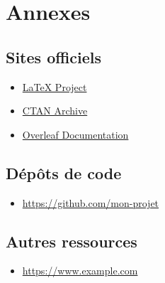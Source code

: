 \appendix

\chapter{Annexes}

\section{Sites officiels}

\begin{itemize}
	\item \href{https://www.latex-project.org/}{LaTeX Project}
	\item \href{https://ctan.org/}{CTAN Archive}
	\item \href{https://www.overleaf.com/learn}{Overleaf Documentation}
\end{itemize}

\section{Dépôts de code}

\begin{itemize}
	\item \url{https://github.com/mon-projet}
\end{itemize}

\section{Autres ressources}

\begin{itemize}
	\item \url{https://www.example.com}
\end{itemize}
